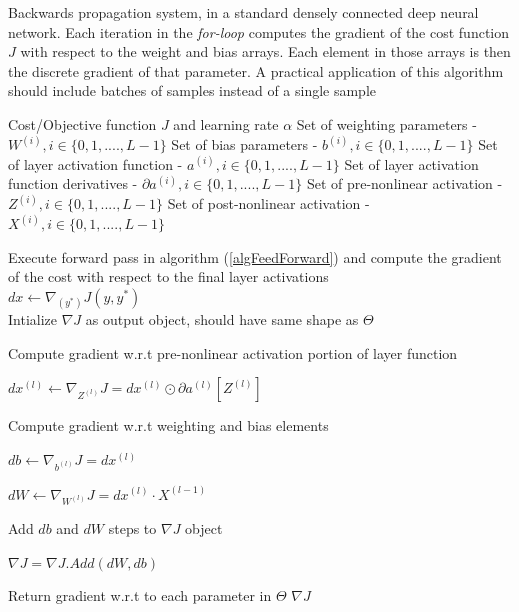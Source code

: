 \documentclass[12pt,letterpaper]{article}
\begin{document}
\begin{algorithm}[H]
\caption{Backwards propagation system, in a standard densely connected deep neural network. Each iteration in the \textit{for-loop} computes the gradient of the cost function $J$ with respect to the weight and bias arrays. Each element in those arrays is then the discrete gradient of that parameter. A practical application of this algorithm should include batches of samples instead of a single sample}
\label{algBackProp}

\begin{algorithmic}
\REQUIRE Cost/Objective function $J$ and learning rate $\alpha$
\REQUIRE Set of weighting parameters - $W^{(i)}, i \in \{0,1,....,L-1\}$
\REQUIRE Set of bias parameters - $b^{(i)}, i \in \{0,1,....,L-1\}$
\REQUIRE Set of layer activation function - $a^{(i)}, i \in \{0,1,....,L-1\}$
\REQUIRE Set of layer activation function derivatives - $\partial a^{(i)}, i \in \{0,1,....,L-1\}$
\REQUIRE Set of pre-nonlinear activation - $Z^{(i)}, i \in \{0,1,....,L-1\}$
\REQUIRE Set of post-nonlinear activation - $X^{(i)}, i \in \{0,1,....,L-1\}$

Execute forward pass in algorithm (\ref{algFeedForward}) and compute the gradient of the cost with respect to the final layer activations \\
$dx \leftarrow \nabla_{(y^*)}J(y,y^*)$ \\
Intialize $\nabla J$ as output object, should have same shape as $\Theta$

	\item Compute gradient w.r.t pre-nonlinear activation portion of layer function
	\item $dx^{(l)} \leftarrow \nabla_{Z^{(l)}}J = dx^{(l)} \odot \partial a^{(l)}[ Z^{(l)} ]$
	\item Compute gradient w.r.t weighting and bias elements
	\item $db \leftarrow \nabla_{b^{(l)}}J = dx^{(l)}$
	\item $dW \leftarrow \nabla_{W^{(l)}}J = dx^{(l)} \cdot X^{(l-1)}$

	\item Add $db$ and $dW$ steps to $\nabla J$ object
	\item $\nabla J = \nabla J .Add(dW,db)$
\ENDFOR

\item Return gradient w.r.t to each parameter in $\Theta$
\RETURN $\nabla J$

\end{algorithmic}
\end{algorithm}
\end{document}

